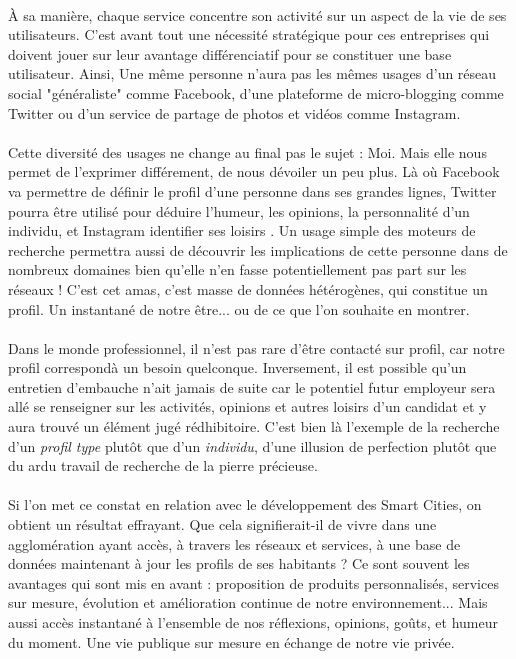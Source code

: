 \paragraph{} À sa manière, chaque service concentre son activité sur un aspect de la vie de ses utilisateurs. C'est avant 
tout une nécessité stratégique pour ces entreprises qui doivent jouer sur leur avantage différenciatif pour se constituer
une base utilisateur. Ainsi, Une même personne n'aura pas les mêmes usages d'un réseau social "généraliste" comme Facebook, 
d'une plateforme de micro-blogging comme Twitter ou d'un service de partage de photos et vidéos comme Instagram.

\paragraph{} Cette diversité des usages ne change au final pas le sujet : Moi. Mais elle nous permet de l'exprimer différement, 
de nous dévoiler un peu plus. Là où Facebook va permettre de définir le profil d'une personne dans ses grandes lignes, 
Twitter pourra être utilisé pour déduire l'humeur, les opinions, la personnalité d'un individu, et Instagram identifier
ses loisirs \cite{SocialMedia4}. Un usage simple des moteurs de recherche permettra aussi de découvrir les implications
de cette personne dans de nombreux domaines bien qu'elle n'en fasse potentiellement pas part sur les réseaux ! C'est cet 
amas, c'est masse de données hétérogènes, qui constitue un profil. Un instantané de notre être... ou de ce que l'on souhaite
en montrer.

\paragraph{} Dans le monde professionnel, il n'est pas rare d'être contacté \guillemotleft sur profil\guillemotright,
car \guillemotleft notre profil correspond\guillemotright à un besoin quelconque. Inversement, il est possible qu'un
entretien d'embauche n'ait jamais de suite car le potentiel futur employeur sera allé se renseigner sur les activités, 
opinions et autres loisirs d'un candidat et y aura trouvé un élément jugé rédhibitoire. C'est bien là l'exemple de la 
recherche d'un \emph{profil type} plutôt que d'un \emph{individu}, d'une illusion de perfection plutôt que du ardu travail
de recherche de la pierre précieuse.

\paragraph{} Si l'on met ce constat en relation avec le développement des Smart Cities, on obtient un résultat
effrayant. Que cela signifierait-il de vivre dans une agglomération ayant accès, à travers les réseaux et services, à une
base de données maintenant à jour les profils de ses habitants ? Ce sont souvent les avantages qui sont mis en avant : 
proposition de produits personnalisés, services sur mesure, évolution et amélioration continue de notre environnement...
Mais aussi accès instantané à l'ensemble de nos réflexions, opinions, goûts, et humeur du moment. Une vie publique sur 
mesure en échange de notre vie privée.

